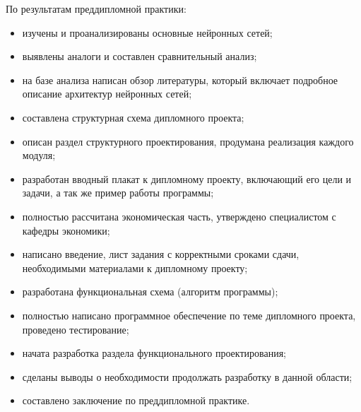 \label{sec:outro}

По результатам преддипломной практики:
\begin{itemize}
    \item изучены и проанализированы основные нейронных сетей;
    \item выявлены аналоги и составлен сравнительный анализ;
    \item на базе анализа написан обзор литературы, который включает подробное описание архитектур нейронных сетей;
    \item составлена структурная схема дипломного проекта;
    \item описан раздел структурного проектирования, продумана реализация каждого модуля;
    \item разработан вводный плакат к дипломному проекту, включающий его цели и задачи, а так же пример работы программы;
    \item полностью рассчитана экономическая часть, утверждено специалистом с кафедры экономики;
    \item написано введение, лист задания с корректными сроками сдачи, необходимыми материалами к дипломному проекту;
    \item разработана функциональная схема (алгоритм программы);
    \item полностью написано программное обеспечение по теме дипломного проекта, проведено тестирование;
    \item начата разработка раздела функционального проектирования;
    \item сделаны выводы о необходимости продолжать разработку в данной области;
    \item составлено заключение по преддипломной практике.
\end{itemize}
